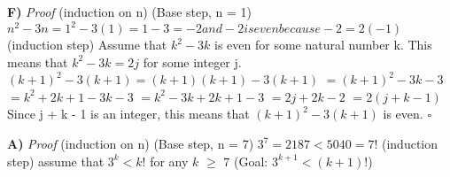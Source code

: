 \documentclass{article}
\begin{document}
\textbf{F)} \textit{Proof} (induction on n)\newline
(Base step, n = 1)\newline
${n^2 - 3n = 1^2 - 3(1) = 1 - 3 = -2 and -2 is even because -2 = 2(-1)}$\newline
(induction step)\newline
Assume that ${k^2 - 3k}$ is even for some natural number k. This means that ${k^2 - 3k = 2j}$ for some integer j.\newline
${(k+1)^2 - 3(k+1) = (k+1)(k+1) - 3(k+1)}$\newline
${ = (k+1)^2 -3k-3}$\newline
${ = k^2 + 2k + 1 -3k - 3}$\newline
${ = k^2 - 3k + 2k + 1 - 3}$\newline
${ = 2j + 2k - 2}$\newline
${ = 2(j + k - 1)}$\newline
Since j + k - 1 is an integer, this means that ${(k+1)^2 - 3(k+1)}$ is even. $\square$
\enddocument





\textbf{A)} \textit{Proof} (induction on n)\newline
(Base step, n = 7)\newline
${3^7 = 2187 < 5040 = 7!}$\newline\newline
(induction step)\newline
assume that ${3^k < k!}$ for any ${k}$ $\geq$ ${7}$\newline
(Goal: ${3^{k+1}<(k+1)!}$)\newline
\end{document}
